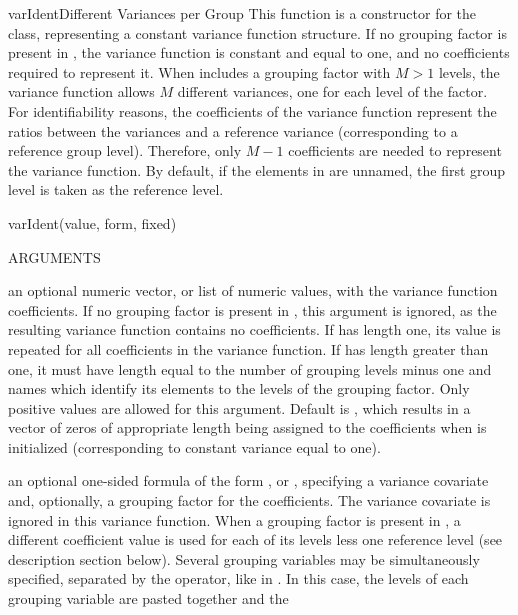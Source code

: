 \documentclass[pdftex]{article} \usepackage{url,graphicx}
\renewcommand{\Twiddle}{\mbox{\(\sim\)}}
\begin{document}
\begin{Helpfile}{varIdent}{Different Variances per Group}
This function is a constructor for the  class,
representing a constant variance function structure. If no grouping
factor is present in , the variance function is constant
and equal to one, and no coefficients required to represent it. When
 includes a grouping factor with $M > 1$ levels, the
variance function allows $M$ different variances, one  for each level of
the factor. For identifiability reasons, the coefficients of the
variance function represent the ratios between the variances and a
reference variance (corresponding to a reference group
level). Therefore, only $M-1$ coefficients are needed to represent
the variance function. By default, if the elements in  are
unnamed, the first group level is taken as the reference level.
\begin{Example}
varIdent(value, form, fixed)
\end{Example}
\begin{Argument}{ARGUMENTS}
\item[\Co{value:}]
an optional numeric vector, or list of numeric values,
with the variance function coefficients. If no grouping factor is
present in , this argument is ignored, as the resulting
variance function contains no coefficients. If  has
length one, its value is repeated for all coefficients in the
variance function. If  has length greater than one, it
must have length equal to the number of grouping levels minus one
and names which identify its elements to the levels of the grouping
factor. Only positive values are allowed for this argument. Default
is , which results in a vector of zeros of
appropriate length being assigned to the coefficients when
 is initialized (corresponding to constant variance 
equal to one).
\item[\Co{form:}] an optional one-sided formula of the form
  \Co{\Twiddle v}, or \Co{\Twiddle v | g}, specifying a variance
  covariate  and, optionally, a grouping factor  for the
  coefficients. The variance covariate is ignored in this variance
  function. When a grouping factor is present in , a
  different coefficient value is used for each of its levels less one
  reference level (see description section below). Several grouping
  variables may be simultaneously specified, separated by the \Co{*}
  operator, like in \Co{{\Twiddle} v | g1 * g2 * g3}. In this case,
  the levels of each grouping variable are pasted together and the

\end{Argument}
\end{Helpfile}
\end{document}
